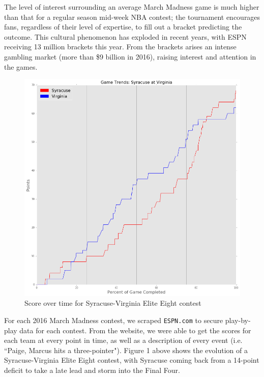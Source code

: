 \documentclass[12pt]{article}
\begin{document}
\begin{doublespacing}
The level of interest surrounding an average March Madness game is much higher than that for a regular season mid-week NBA contest; the tournament encourages fans, regardless of their level of expertise, to fill out a bracket predicting the outcome. This cultural phenomenon has exploded in recent years, with ESPN receiving 13 million brackets this year. From the brackets arises an intense gambling market (more than \$9 billion in 2016), raising interest and attention in the games. 

\begin{figure} [H]
	\centering
	\includegraphics[scale = 0.4] {Images/Cuse_UVA_MarginOverTime.png} 
	\caption{Score over time for Syracuse-Virginia Elite Eight contest}
\end{figure}

For each 2016 March Madness contest, we scraped \texttt{ESPN.com} to secure play-by-play data for each contest. From the website, we were able to get the scores for each team at every point in time, as well as a description of every event (i.e. ``Paige, Marcus hits a three-pointer"). Figure 1 above shows the evolution of a Syracuse-Virginia Elite Eight contest, with Syracuse coming back from a 14-point deficit to take a late lead and storm into the Final Four. 


\end{doublespacing}
\end{document}
